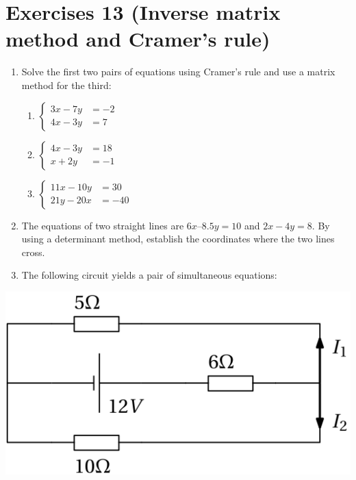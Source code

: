 \documentclass[
  12pt,
  oneside]{book}
\providecommand{\tightlist}{%
  \setlength{\itemsep}{0pt}\setlength{\parskip}{0pt}}
\theoremstyle{definition}
\theoremstyle{definition}
\theoremstyle{definition}
\theoremstyle{definition}
\theoremstyle{remark}
\begin{document}
\hypertarget{exercises-13-inverse-matrix-method-and-cramers-rule}{%
\chapter*{Exercises 13 (Inverse matrix method and Cramer's rule)}\label{exercises-13-inverse-matrix-method-and-cramers-rule}}

\begin{enumerate}
\def\labelenumi{\arabic{enumi}.}
\item
  Solve the first two pairs of equations using Cramer's rule and use a matrix method for the third:

  \begin{enumerate}
  \def\labelenumii{\roman{enumii})}
  \tightlist
  \item
    \(\left\{\begin{aligned}3x-7y&=-2\\4x-3y&=7\end{aligned}\right.\)
  \item
    \(\left\{\begin{aligned}4x-3y&=18\\ x+2y&=-1\end{aligned}\right.\)
  \item
    \(\left\{\begin{aligned}11x-10y&=30\\21y-20x&=-40\end{aligned}\right.\)
  \end{enumerate}
\item
  The equations of two straight lines are \(6x – 8.5y = 10\) and \(2x - 4y = 8\). By using a determinant method, establish the coordinates where the two lines cross.
\item
  The following circuit yields a pair of simultaneous equations:
\end{enumerate}

\begin{center}\includegraphics{t13-circuit} \end{center}
\end{document}
